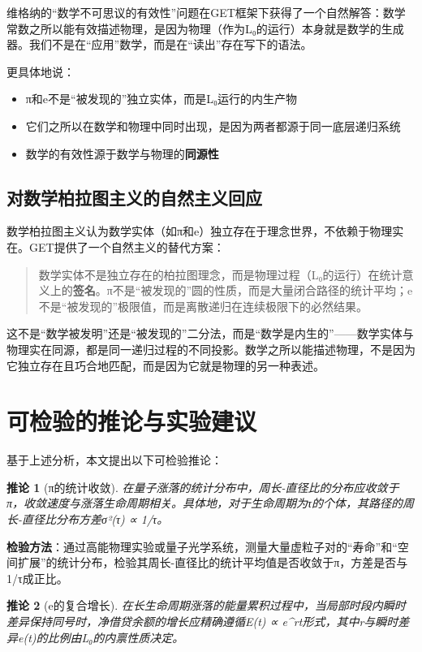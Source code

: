 \documentclass[12pt, a4paper]{article}
\newtheorem{corollary}{推论}[section]
\begin{document}
维格纳的“数学不可思议的有效性”问题\cite{wigner1960}在GET框架下获得了一个自然解答：数学常数之所以能有效描述物理，是因为物理（作为L₀的运行）本身就是数学的生成器。我们不是在“应用”数学，而是在“读出”存在写下的语法。

更具体地说：

\begin{itemize}
\item π和e不是“被发现的”独立实体，而是L₀运行的内生产物
\item 它们之所以在数学和物理中同时出现，是因为两者都源于同一底层递归系统
\item 数学的有效性源于数学与物理的\textbf{同源性}
\end{itemize}

\subsection{对数学柏拉图主义的自然主义回应}

数学柏拉图主义认为数学实体（如π和e）独立存在于理念世界，不依赖于物理实在。GET提供了一个自然主义的替代方案：

\begin{quote}
数学实体不是独立存在的柏拉图理念，而是物理过程（L₀的运行）在统计意义上的\textbf{签名}。π不是“被发现的”圆的性质，而是大量闭合路径的统计平均；e不是“被发现的”极限值，而是离散递归在连续极限下的必然结果。
\end{quote}

这不是“数学被发明”还是“被发现的”二分法，而是“数学是内生的”——数学实体与物理实在同源，都是同一递归过程的不同投影。数学之所以能描述物理，不是因为它独立存在且巧合地匹配，而是因为它就是物理的另一种表述。

\section{可检验的推论与实验建议}

基于上述分析，本文提出以下可检验推论：

\begin{corollary}[π的统计收敛]
在量子涨落的统计分布中，周长-直径比的分布应收敛于π，收敛速度与涨落生命周期相关。具体地，对于生命周期为τ的个体，其路径的周长-直径比分布方差σ²(τ) ∝ 1/τ。
\end{corollary}

\textbf{检验方法}：通过高能物理实验或量子光学系统，测量大量虚粒子对的“寿命”和“空间扩展”的统计分布，检验其周长-直径比的统计平均值是否收敛于π，方差是否与1/τ成正比。

\begin{corollary}[e的复合增长]
在长生命周期涨落的能量累积过程中，当局部时段内瞬时差异保持同号时，净借贷余额的增长应精确遵循E(t) ∝ e^{rt}形式，其中r与瞬时差异e(t)的比例由L₀的内禀性质决定。
\end{corollary}
\end{document}
